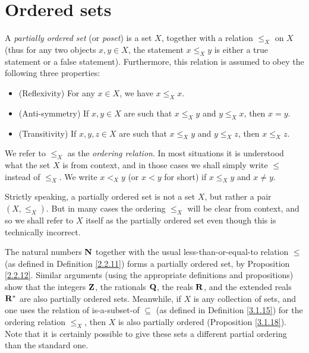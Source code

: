 \section{Ordered sets}\label{sec 8.5}

\begin{definition}\label{8.5.1}
    A \emph{partially ordered set} (or \emph{poset}) is a set \(X\), together with a relation \(\leq_X\) on \(X\)
    (thus for any two objects \(x, y \in X\), the statement \(x \leq_X y\) is either a true statement or a false statement).
    Furthermore, this relation is assumed to obey the following three properties:
    \begin{itemize}
        \item (Reflexivity) For any \(x \in X\), we have \(x \leq_X x\).
        \item (Anti-symmetry) If \(x, y \in X\) are such that \(x \leq_X y\) and \(y \leq_X x\), then \(x = y\).
        \item (Transitivity) If \(x, y, z \in X\) are such that \(x \leq_X y\) and \(y \leq_X z\), then \(x \leq_X z\).
    \end{itemize}
    We refer to \(\leq_X\) as the \emph{ordering relation}.
    In most situations it is understood what the set \(X\) is from context, and in those cases we shall simply write \(\leq\) instead of \(\leq_X\).
    We write \(x <_X y\) (or \(x < y\) for short) if \(x \leq_X y\) and \(x \neq y\).
\end{definition}

\begin{note}
    Strictly speaking, a partially ordered set is not a set \(X\), but rather a pair \((X, \leq_X)\).
    But in many cases the ordering \(\leq_X\) will be clear from context, and so we shall refer to \(X\) itself as the partially ordered set even though this is technically incorrect.
\end{note}

\begin{example}\label{8.5.2}
    The natural numbers \(\mathbf{N}\) together with the usual less-than-or-equal-to relation \(\leq\) (as defined in Definition \ref{2.2.11}) forms a partially ordered set, by Proposition \ref{2.2.12}.
    Similar arguments (using the appropriate definitions and propositions) show that the integers \(\mathbf{Z}\), the rationals \(\mathbf{Q}\), the reals \(\mathbf{R}\), and the extended reals \(\mathbf{R}^*\) are also partially ordered sets.
    Meanwhile, if \(X\) is any collection of sets, and one uses the relation of is-a-subset-of \(\subseteq\) (as defined in Definition \ref{3.1.15}) for the ordering relation \(\leq_X\), then \(X\) is also partially ordered (Proposition \ref{3.1.18}).
    Note that it is certainly possible to give these sets a different partial ordering than the standard one.
\end{example}

